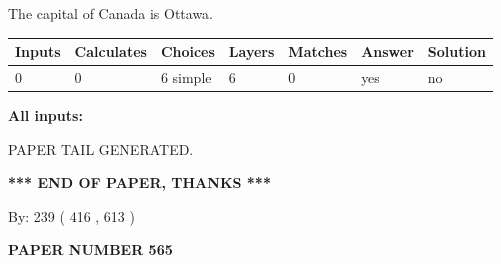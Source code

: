 \documentclass[12pt]{article}
\begin{document}
 
The capital of Canada is Ottawa.
 
 
\noindent{}
 
 
   
   
   
   
\noindent\begin{tabular}{|l|l|l|l|l|l|l|}
 \hline
Inputs & Calculates & Choices & Layers & Matches & Answer & Solution \\ \hline
 0  & 
 0  & 
 6
  simple  
  & 
 6  & 
 0  & 
  yes & 
  no 
  \\ \hline
 \end{tabular}
   
   
   
   
\noindent{}
   
   
   
   
\noindent\vspace{0.1in}\hspace{-0.08in} {\textbf{\Large{All inputs: }}}
   
   
   
   
   
   
 \vspace{0.2in}
 
   
   
\vspace{2.0in} PAPER TAIL GENERATED.
   
   
   
   
\vspace{1.0in} 
{\textbf{\large{ *** END OF PAPER, THANKS *** }}} 
   
   
\hspace{1.0in} By: 
 239 ( 416 ,  613 )
   
   
   
   
\newpage 
\setcounter{page}{ 
   565001 } 
   
   
   
   
 {\textbf{ \Large{ PAPER NUMBER  565  }}}
   
   
\vspace{0.2in}
   
   
   
   
   
   
   
\end{document}
